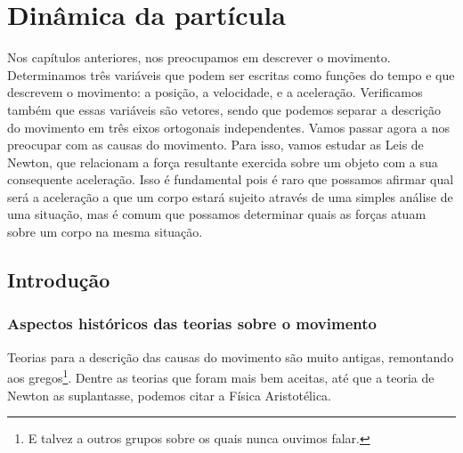 \chapter{Dinâmica da partícula}
\label{Chap:Dinamica}


\begin{fullwidth}
{\it

Nos capítulos anteriores, nos preocupamos em descrever o movimento. Determinamos três variáveis que podem ser escritas como funções do tempo e que descrevem o movimento: a posição, a velocidade, e a aceleração. Verificamos também que essas variáveis são vetores, sendo que podemos separar a descrição do movimento em três eixos ortogonais independentes. Vamos passar agora a nos preocupar com as causas do movimento. Para isso, vamos estudar as Leis de Newton, que relacionam a força resultante exercida sobre um objeto com a sua consequente aceleração. Isso é fundamental pois é raro que possamos afirmar qual será a aceleração a que um corpo estará sujeito através de uma simples análise de uma situação, mas é comum que possamos determinar quais as forças atuam sobre um corpo na mesma situação.
}
\end{fullwidth}

\section{Introdução}


\subsection{Aspectos históricos das teorias sobre o movimento}

Teorias para a descrição das causas do movimento são muito antigas, remontando aos gregos\footnote{E talvez a outros grupos sobre os quais nunca ouvimos falar.}. Dentre as teorias que foram mais bem aceitas, até que a teoria de Newton as suplantasse, podemos citar a Física Aristotélica.

